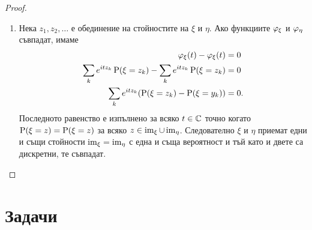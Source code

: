 \documentclass[numbers=endperiod, DIV=15, bibliography=totocnumbered]{scrartcl}
\begin{document}
\begin{proof}
\begin{enumerate}
    \item Нека $z_1, z_2, \ldots$ е обединение на стойностите на $\xi$ и $\eta$. Ако функциите $\varphi_\xi$ и $\varphi_\eta$ съвпадат, имаме
    \begin{align*}
      \varphi_\xi(t) - \varphi_\xi(t) &= 0
      \\
      \sum_k e^{i t z_k} \operatorname{P}(\xi = z_k) - \sum_k e^{i t z_k} \operatorname{P}(\xi = z_k) &= 0
      \\
      \sum_k e^{i t z_k} (\operatorname{P}(\xi = z_k) - \operatorname{P}(\xi = y_k)) &= 0.
    \end{align*}
    Последното равенство е изпълнено за всяко $t \in \mathbb{C}$ точно когато $\operatorname{P}(\xi = z) = \operatorname{P}(\xi = z)$ за всяко $z \in \operatorname{im}_\xi \cup \operatorname{im}_\eta$. Следователно $\xi$ и $\eta$ приемат едни и същи стойности $\operatorname{im}_\xi = \operatorname{im}_\eta$ с една и съща вероятност и тъй като и двете са дискретни, те съвпадат.
  \end{enumerate}
\end{proof}

\section{Задачи}

\printbibliography
\end{document}
